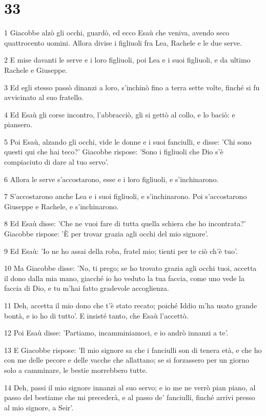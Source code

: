 \chapter{33}

\par 1 Giacobbe alzò gli occhi, guardò, ed ecco Esaù che veniva, avendo seco quattrocento uomini. Allora divise i figliuoli fra Lea, Rachele e le due serve.
\par 2 E mise davanti le serve e i loro figliuoli, poi Lea e i suoi figliuoli, e da ultimo Rachele e Giuseppe.
\par 3 Ed egli stesso passò dinanzi a loro, s'inchinò fino a terra sette volte, finché si fu avvicinato al suo fratello.
\par 4 Ed Esaù gli corse incontro, l'abbracciò, gli si gettò al collo, e lo baciò: e piansero.
\par 5 Poi Esaù, alzando gli occhi, vide le donne e i suoi fanciulli, e disse: 'Chi sono questi qui che hai teco?' Giacobbe rispose: 'Sono i figliuoli che Dio s'è compiaciuto di dare al tuo servo'.
\par 6 Allora le serve s'accostarono, esse e i loro figliuoli, e s'inchinarono.
\par 7 S'accostarono anche Lea e i suoi figliuoli, e s'inchinarono. Poi s'accostarono Giuseppe e Rachele, e s'inchinarono.
\par 8 Ed Esaù disse: 'Che ne vuoi fare di tutta quella schiera che ho incontrata?' Giacobbe rispose: 'È per trovar grazia agli occhi del mio signore'.
\par 9 Ed Esaù: 'Io ne ho assai della roba, fratel mio; tienti per te ciò ch'è tuo'.
\par 10 Ma Giacobbe disse: 'No, ti prego; se ho trovato grazia agli occhi tuoi, accetta il dono dalla mia mano, giacché io ho veduto la tua faccia, come uno vede la faccia di Dio, e tu m'hai fatto gradevole accoglienza.
\par 11 Deh, accetta il mio dono che t'è stato recato; poiché Iddio m'ha usato grande bontà, e io ho di tutto'. E insisté tanto, che Esaù l'accettò.
\par 12 Poi Esaù disse: 'Partiamo, incamminiamoci, e io andrò innanzi a te'.
\par 13 E Giacobbe rispose: 'Il mio signore sa che i fanciulli son di tenera età, e che ho con me delle pecore e delle vacche che allattano; se si forzassero per un giorno solo a camminare, le bestie morrebbero tutte.
\par 14 Deh, passi il mio signore innanzi al suo servo; e io me ne verrò pian piano, al passo del bestiame che mi precederà, e al passo de' fanciulli, finché arrivi presso al mio signore, a Seir'.
